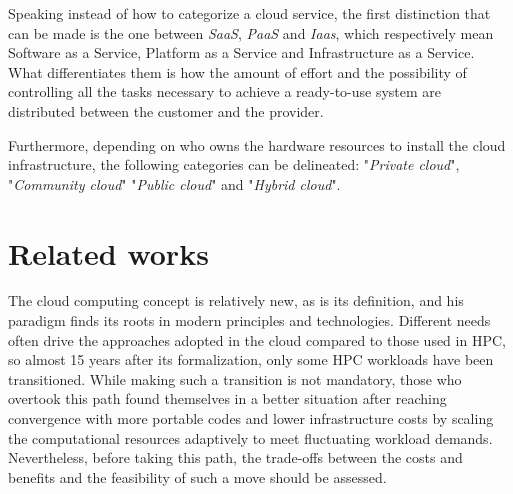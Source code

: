 Speaking instead of how to categorize a cloud service, the first distinction that
can be made is the one between \textit{SaaS}, \textit{PaaS} and \textit{Iaas}, which
respectively mean Software as a Service, Platform as a Service and
Infrastructure as a Service. What differentiates them is how the amount of
effort and the possibility of controlling all the tasks necessary to achieve a
ready-to-use system are distributed between the customer and the provider.

\noindent Furthermore, depending on who owns the hardware resources to install the cloud
infrastructure, the following categories can be delineated: "\textit{Private
  cloud}", "\textit{Community cloud}" "\textit{Public cloud}" and
"\textit{Hybrid cloud}".

\section*{Related works}\label{sec:intro-related-works}

The cloud computing concept is relatively new, as is its definition, and his
paradigm finds its roots in modern principles and technologies. Different needs
often drive the approaches adopted in the cloud compared to those used in HPC,
so almost 15 years after its formalization, only some HPC workloads have been
transitioned. While making such a transition is not mandatory, those who
overtook this path found themselves in a better situation after reaching
convergence with more portable codes and lower infrastructure costs by scaling
the computational resources adaptively to meet fluctuating workload demands.
Nevertheless, before taking this path, the trade-offs between the costs and
benefits and the feasibility of such a move should be assessed.

